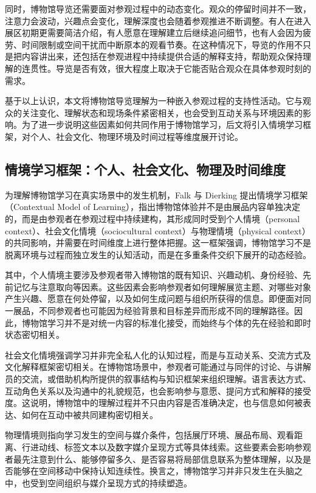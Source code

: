 同时，博物馆导览还需要面对参观过程中的动态变化。观众的停留时间并不一致，注意力会波动，兴趣点会变化，理解深度也会随着参观推进不断调整\cite{falk2016}。有人在进入展区初期更需要简洁介绍，有人愿意在理解建立后继续追问细节，也有人会因为疲劳、时间限制或空间干扰而中断原本的观看节奏。在这种情况下，导览的作用不只是把内容讲出来，还包括在参观进程中持续提供合适的解释支持，帮助观众保持理解的连贯性。导览是否有效，很大程度上取决于它能否贴合观众在具体参观时刻的需求。

基于以上认识，本文将博物馆导览理解为一种嵌入参观过程的支持性活动\cite{falk2016,li2024}。它与观众的关注变化、理解状态和现场条件紧密相关，也会受到互动关系与环境因素的影响。为了进一步说明这些因素如何共同作用于博物馆学习，后文将引入情境学习框架，对个人、社会文化、物理环境及时间过程等维度展开讨论\cite{falk2016}。

\subsection{情境学习框架：个人、社会文化、物理及时间维度}
为理解博物馆学习在真实场景中的发生机制，Falk 与 Dierking 提出情境学习框架（Contextual Model of Learning），指出博物馆体验并不是由展品内容单独决定的，而是由参观者在参观过程中持续建构，其形成同时受到个人情境（personal context）、社会文化情境（sociocultural context）与物理情境（physical context）的共同影响，并需要在时间维度上进行整体把握\cite{falk2016}。这一框架强调，博物馆学习不是脱离环境与过程而独立发生的认知活动，而是在多重条件交织下展开的动态经验。

其中，个人情境主要涉及参观者带入博物馆的既有知识、兴趣动机、身份经验、先前记忆与注意取向等因素\cite{falk2016}。这些因素会影响参观者如何理解展览主题、对哪些对象产生兴趣、愿意在何处停留，以及如何生成问题与组织所获得的信息。即便面对同一展品，不同参观者也可能因为经验背景和目标差异而形成不同的理解路径\cite{falk2016,li2024}。因此，博物馆学习并不是对统一内容的标准化接受，而始终与个体的先在经验和即时状态密切相关。

社会文化情境强调学习并非完全私人化的认知过程，而是与互动关系、交流方式及文化解释框架密切相关\cite{falk2016}。在博物馆场景中，参观者可能通过与同伴的讨论、与讲解员的交流，或借助机构所提供的叙事结构与知识框架来组织理解。语言表达方式、互动角色关系以及沟通中的礼貌规范，也会影响参与意愿、提问方式和解释的接受度\cite{falk2016,luo2024}。这说明，博物馆中的理解过程并不只由内容是否准确决定，也与信息如何被表达、如何在互动中被共同建构密切相关。

物理情境则指向学习发生的空间与媒介条件，包括展厅环境、展品布局、观看距离、行进动线、标签文本以及数字媒介呈现方式等具体线索\cite{falk2016,luo2024}。这些要素会影响参观者最先注意到什么、能够停留多久、是否容易将局部信息联系为整体理解，以及是否能够在空间移动中保持认知连续性。换言之，博物馆学习并非只发生在头脑之中，也受到空间组织与媒介呈现方式的持续塑造\cite{falk2016}。

